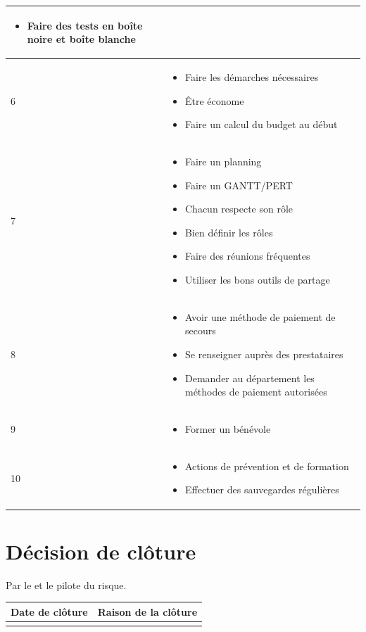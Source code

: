 \begin{longtable}{|p{7cm}|p{7cm}|}
\begin{itemize}
		\item Faire des tests en boîte noire et boîte blanche
	\end{itemize} \\
	\hline
	6 & \begin{itemize}
		\item Faire les démarches nécessaires
		\item Être économe
		\item Faire un calcul du budget au début
	\end{itemize} \\
	\hline
	7 & \begin{itemize}
		\item Faire un planning
		\item Faire un GANTT/PERT
		\item Chacun respecte son rôle
		\item Bien définir les rôles
		\item Faire des réunions fréquentes
		\item Utiliser les bons outils de partage
	\end{itemize} \\
	\hline
	8 & \begin{itemize}
		\item Avoir une méthode de paiement de secours
		\item Se renseigner auprès des prestataires
		\item Demander au département les méthodes de paiement autorisées
	\end{itemize} \\
	\hline
	9 & \begin{itemize}
		\item Former un bénévole
	\end{itemize} \\
	\hline
	10 & \begin{itemize}
		\item Actions de prévention et de formation
		\item Effectuer des sauvegardes régulières
	\end{itemize} \\
	\hline
	\end{longtable}

\flushleft

\section*{Décision de clôture}
Par le \CP{} et le pilote du risque.
\begin{table}[H]
\centering
	\begin{tabularx}{16.8cm}{|X|X|}
	\hline
	\rowcolor{gray!40} Date de clôture & Raison de la clôture \\
	\hline
	  & \\
	\hline
	\end{tabularx}
\end{table}

